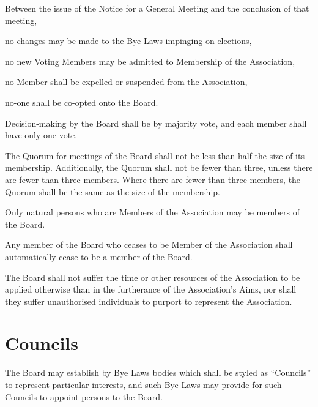 \documentclass[10pt]{mk-articles-of-association}
\newcommand{\EC}[0]{Board}
\newcommand{\Exec}[0]{\EC{} }
\begin{document}
\begin{constenum}
  \item Between the issue of the Notice for a General Meeting and
    the conclusion of that meeting,
    \begin{constenum}
      \item no changes may be made to the Bye Laws impinging on elections,
      \item no new Voting Members may be admitted to Membership of
        the Association,
      \item no Member shall be expelled or suspended from the Association, \ITand
      \item no-one shall be co-opted onto the \EC{}.
    \end{constenum}

  \item Decision-making by the \Exec shall be by majority vote, and each
    member shall have only one vote.

  \item The Quorum for meetings of the \Exec shall not be less than
    half the size of its membership. Additionally, the Quorum shall
    not be fewer than three, unless there are fewer than three
    members. Where there are fewer than three members, the Quorum shall
    be the same as the size of the membership.

  \item Only natural persons who are Members of the Association
    may be members of the \EC{}.

  \item Any member of the \Exec who ceases to be Member of the Association
    shall automatically cease to be a member of the \EC{}.

  \item The \Exec shall not suffer the time or other resources of
    the Association to be applied otherwise than in the furtherance of
    the Association's Aims, nor shall they suffer unauthorised individuals
    to purport to represent the Association.

\end{constenum}



\section{Councils}
\label{councils}

The \EC{} may establish by Bye Laws bodies which
  shall be styled as ``Councils'' to represent particular interests, and
  such Bye Laws may provide for such Councils to appoint persons to
  the \EC{}.
\end{document}
